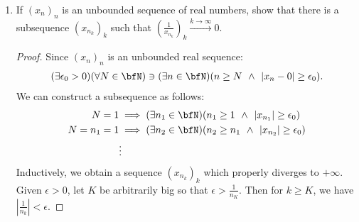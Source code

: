 \begin{enumerate}[label = (\arabic*)]
        \item If $(x_n)_n$ is an unbounded sequence of real numbers, show that there is a subsequence $(x_{n_k})_k$ such that $\left(\frac{1}{x_{n_k}}\right)_k \xrightarrow{k \rightarrow \infty} 0$.
            {\color{red} \begin{proof}
                Since $(x_n)_n$ is an unbounded real sequence:
                    \begin{equation*}
                    \begin{split}
                        (\exists \epsilon_0 > 0)(\forall N \in \bfN) \ni (\exists n \in \bfN)(n \geq N \hspace{4pt}\land\hspace{4pt}|x_n - 0| \geq \epsilon_0).
                    \end{split}
                    \end{equation*}
                We can construct a subsequence as follows:
                    \begin{equation*}
                    \begin{split}
                        N = 1 &\implies (\exists n_1 \in \bfN)(n_1 \geq 1 \hspace{4pt}\land\hspace{4pt} |x_{n_1}| \geq \epsilon_0)\\
                        N = n_1 = 1 & \implies (\exists n_2 \in \bfN)(n_2 \geq n_1 \hspace{4pt}\land\hspace{4pt} |x_{n_2}| \geq \epsilon_0)\\
                        &\vdots
                    \end{split}
                    \end{equation*}
                Inductively, we obtain a sequence $(x_{n_k})_k$ which properly diverges to $+\infty$. Given $\epsilon > 0$, let $K$ be arbitrarily big so that $\epsilon > \frac{1}{n_K}$. Then for $k \geq K$, we have $\left|\frac{1}{n_k}\right| < \epsilon$.
            \end{proof}}


\end{enumerate}
